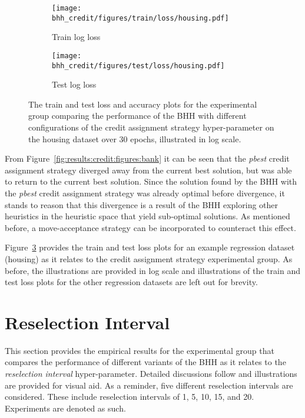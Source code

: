 \begin{figure}[htbp]
      \begin{subfigure}{0.5\textwidth}
            \centering
            \texttt{[image: bhh\_credit/figures/train/loss/housing.pdf]}
            \caption{Train log loss}
            \label{fig:results:credit:figures:loss:train:housing}
      \end{subfigure}
      \begin{subfigure}{0.5\textwidth}
            \centering
            \texttt{[image: bhh\_credit/figures/test/loss/housing.pdf]}
            \caption{Test log loss}
            \label{fig:results:credit:figures:loss:test:housing}
      \end{subfigure}
      \par\bigskip
      \caption{The train and test loss and accuracy plots for the experimental group comparing the performance of the \acs{BHH} with different configurations of the credit assignment strategy hyper-parameter on the housing dataset over 30 epochs, illustrated in log scale.}
      \label{fig:results:credit:figures:housing}
\end{figure}

From Figure~\ref{fig:results:credit:figures:bank} it can be seen that the \textit{pbest} credit assignment strategy diverged away from the current best solution, but was able to return to the current best solution. Since the solution found by the \acs{BHH} with the \textit{pbest} credit assignment strategy was already optimal before divergence, it stands to reason that this divergence is a result of the \acs{BHH} exploring other heuristics in the heuristic space that yield sub-optimal solutions. As mentioned before, a move-acceptance strategy can be incorporated to counteract this effect.

Figure~\ref{fig:results:credit:figures:housing} provides the train and test loss plots for an example regression dataset (housing) as it relates to the credit assignment strategy experimental group. As before, the illustrations are provided in log scale and illustrations of the train and test loss plots for the other regression datasets are left out for brevity.


\section{Reselection Interval}\label{sec:results:reselection}

This section provides the empirical results for the experimental group that compares the performance of different variants of the \acs{BHH} as it relates to the \textit{reselection interval} hyper-parameter. Detailed discussions follow and illustrations are provided for visual aid. As a reminder, five different reselection intervals are considered. These include reselection intervals of 1, 5, 10, 15, and 20. Experiments are denoted as such.

